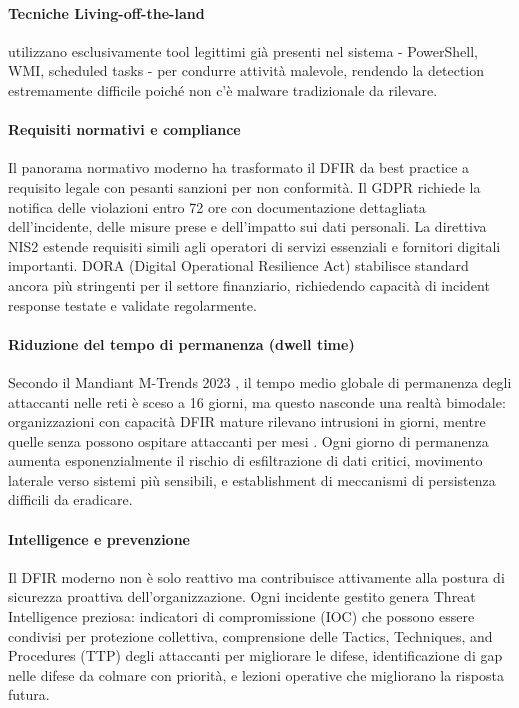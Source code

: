 \paragraph{Tecniche Living-off-the-land} utilizzano esclusivamente tool legittimi già presenti nel sistema - PowerShell, WMI, scheduled tasks - per condurre attività malevole, rendendo la detection estremamente difficile poiché non c'è malware tradizionale da rilevare.

\paragraph{Requisiti normativi e compliance}
Il panorama normativo moderno ha trasformato il DFIR da best practice a requisito legale con pesanti sanzioni per non conformità. Il GDPR \cite{gdpr2016} richiede la notifica delle violazioni entro 72 ore con documentazione dettagliata dell'incidente, delle misure prese e dell'impatto sui dati personali. La direttiva NIS2 \cite{nis2_2022} estende requisiti simili agli operatori di servizi essenziali e fornitori digitali importanti. DORA (Digital Operational Resilience Act) \cite{dora2022} stabilisce standard ancora più stringenti per il settore finanziario, richiedendo capacità di incident response testate e validate regolarmente.

\paragraph{Riduzione del tempo di permanenza (dwell time)}
Secondo il Mandiant M-Trends 2023 \cite{mandiant2023}, il tempo medio globale di permanenza degli attaccanti nelle reti è sceso a 16 giorni, ma questo nasconde una realtà bimodale: organizzazioni con capacità DFIR mature rilevano intrusioni in giorni, mentre quelle senza possono ospitare attaccanti per mesi . Ogni giorno di permanenza aumenta esponenzialmente il rischio di esfiltrazione di dati critici, movimento laterale verso sistemi più sensibili, e establishment di meccanismi di persistenza difficili da eradicare.

\paragraph{Intelligence e prevenzione}
Il DFIR moderno non è solo reattivo ma contribuisce attivamente alla postura di sicurezza proattiva dell'organizzazione. Ogni incidente gestito genera Threat Intelligence preziosa: indicatori di compromissione (IOC) che possono essere condivisi per protezione collettiva, comprensione delle Tactics, Techniques, and Procedures (TTP) degli attaccanti per migliorare le difese, identificazione di gap nelle difese da colmare con priorità, e lezioni operative che migliorano la risposta futura.

